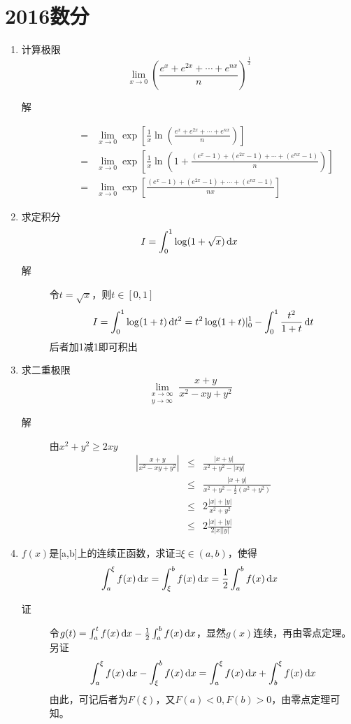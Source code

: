 \section{2016数分}
\begin{enumerate}
\item 计算极限
\[
\lim_{x \to 0}\left( \frac{e^x+e^{2x}+\cdots + e^{nx}}{n} \right)^{\frac{1}{x}}
\]
\begin{description}
\item[解]
\begin{eqnarray*}
 & = & \lim_{x \to 0} \exp\left[\frac{1}{x} \ln\left( \frac{e^x+e^{2x}+\cdots + e^{nx}}{n} \right)\right] \\
 & = & \lim_{x \to 0} \exp\left[\frac{1}{x} \ln\left(1+ \frac{(e^x-1)+(e^{2x}-1)+\cdots + (e^{nx}-1)}{n} \right)\right] \\
 & = & \lim_{x \to 0} \exp\left[\frac{(e^x-1)+(e^{2x}-1)+\cdots + (e^{nx}-1)}{nx} \right] 
\end{eqnarray*}
\end{description}

\item 求定积分
\[
I = \int_0^1 \log(1+\sqrt{x}) \,\mathrm{d} x
\]
\begin{description}
\item[解] 令$t=\sqrt{x}$，则$t\in [0,1]$
\[
I = \int_0^1 \log(1+t)\,\mathrm{d} t^2 = t^2\log(1+t)|_0^1-\int_0^1 \frac{t^2}{1+t}\,\mathrm{d} t
\]
后者加1减1即可积出
\end{description}

\item 求二重极限
\[
\lim_{ \substack {x \to \infty \\ y \to \infty} } \frac{x+y}{x^2-xy+y^2}
\]
\begin{description}
\item[解] 由$x^2+y^2 \geq 2xy$
\begin{eqnarray*}
\left|\frac{x+y}{x^2-xy+y^2}\right| & \leq  & \frac{|x+y|}{x^2+y^2-|xy|}\\
& \leq  & \frac{|x+y|}{x^2+y^2-\frac{1}{2}(x^2+y^2)}\\
& \leq  & 2\frac{|x|+|y|}{x^2+y^2}\\
& \leq  & 2\frac{|x|+|y|}{2|x||y|}
\end{eqnarray*}
\end{description}

\item $f(x)$是[a,b]上的连续正函数，求证$\exists \xi \in (a,b)$，使得
\[
\int_a^{\xi} f(x)\,\mathrm{d} x = \int_{\xi}^b f(x)\,\mathrm{d} x = \frac{1}{2}\int_a^b f(x)\,\mathrm{d} x
\]
\begin{description}
\item[证] 令$g(t) = \int_a^t f(x)\,\mathrm{d} x - \frac{1}{2}\int_a^b f(x)\,\mathrm{d} x$，显然$g(x)$连续，再由零点定理。另证
\[
\int_a^{\xi} f(x)\,\mathrm{d} x - \int_{\xi}^b f(x)\,\mathrm{d} x = \int_a^{\xi} f(x)\,\mathrm{d} x + \int_b^{\xi} f(x)\,\mathrm{d} x
\]
由此，可记后者为$F(\xi)$，又$F(a)<0,F(b)>0$，由零点定理可知。
\end{description}


\end{enumerate}
